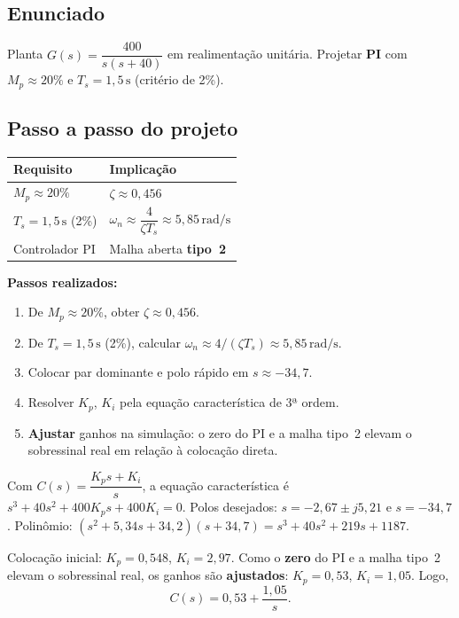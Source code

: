 \documentclass[11pt,a4paper]{article}
\begin{document}
\subsection*{Enunciado}

Planta $G(s)=\dfrac{400}{s(s+40)}$ em realimentação unitária. Projetar
\textbf{PI} com $M_p\approx 20\%$ e $T_s=1{,}5\,\mathrm{s}$ (critério de 2\%).

\subsection*{Passo a passo do projeto}

\begin{center}
\begin{tabular}{@{}ll@{}}
  \toprule
  Requisito & Implicação \\
  \midrule
  $M_p\approx 20\%$ & $\zeta\approx 0{,}456$ \\
  $T_s=1{,}5\,\mathrm{s}$ (2\%) & $\omega_n\approx\dfrac{4}{\zeta T_s}\approx 5{,}85\,\mathrm{rad/s}$ \\
  Controlador PI & Malha aberta \textbf{tipo~2} \\
  \bottomrule
\end{tabular}
\end{center}

\textbf{Passos realizados:}
\begin{enumerate}[leftmargin=*]
  \item De $M_p\approx 20\%$, obter $\zeta\approx 0{,}456$.
  \item De $T_s=1{,}5\,\mathrm{s}$ (2\%), calcular
        $\omega_n\approx 4/(\zeta T_s)\approx 5{,}85\,\mathrm{rad/s}$.
  \item Colocar par dominante e polo rápido em $s\approx -34{,}7$.
  \item Resolver $K_p$, $K_i$ pela equação característica de 3ª ordem.
  \item \textbf{Ajustar} ganhos na simulação: o zero do PI e a malha tipo~2
        elevam o sobressinal real em relação à colocação direta.
\end{enumerate}

Com $C(s)=\dfrac{K_p s+K_i}{s}$, a equação característica é
$s^3+40s^2+400K_p s+400K_i=0$. Polos desejados:
$s=-2{,}67\pm j5{,}21$ e $s=-34{,}7$. Polinômio:
$(s^2+5{,}34s+34{,}2)(s+34{,}7)=s^3+40s^2+219s+1187$.

Colocação inicial: $K_p=0{,}548$, $K_i=2{,}97$. Como o \textbf{zero} do PI e a
malha tipo~2 elevam o sobressinal real, os ganhos são \textbf{ajustados}:
$K_p=0{,}53$, $K_i=1{,}05$. Logo,
\[
  C(s)=0{,}53+\frac{1{,}05}{s}.
\]
\end{document}
